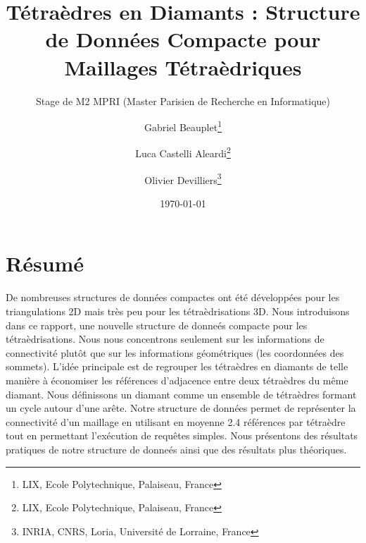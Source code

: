 \documentclass[a4paper,11pt,openany]{article}
\title{Tétraèdres en Diamants : Structure de Données Compacte pour Maillages Tétraèdriques}
\author{
   Gabriel Beauplet\thanks{LIX, Ecole Polytechnique, Palaiseau, France}
   \and
   Luca Castelli Aleardi\thanks{LIX, Ecole Polytechnique, Palaiseau, France}
   \and
   Olivier Devilliers\thanks{INRIA, CNRS, Loria, Université de Lorraine, France}
}
\subtitle{Stage de M2 MPRI (Master Parisien de Recherche en Informatique)}
\date{\today}
\begin{document}
\maketitle

\section{Résumé}
\noindent
De nombreuses structures de données compactes ont été développées pour les triangulations 2D mais très peu pour les tétraèdrisations 3D. Nous introduisons dans ce rapport, une nouvelle structure de donneés compacte pour les tétraèdrisations. Nous nous concentrons seulement sur les informations de connectivité plutôt que sur les informations géométriques (les coordonnées des sommets). L'idée principale est de regrouper les tétraèdres en diamants de telle manière à économiser les références d'adjacence entre deux tétraèdres du même diamant. Nous définissons un diamant comme un ensemble de tétraèdres formant un cycle autour d'une arête. Notre structure de données permet de représenter la connectivité d'un maillage en utilisant en moyenne 2.4 références par tétraèdre tout en permettant l'exécution de requêtes simples. Nous présentons des résultats pratiques de notre structure de donneés ainsi que des résultats plus théoriques.
\end{document}
